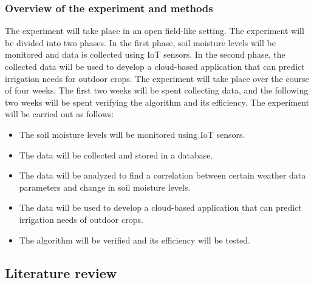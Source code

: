 \documentclass[11pt]{scrartcl} %
\begin{document}
\subsubsection{Overview of the experiment and methods}
The experiment will take place in an open field-like setting. The experiment will be divided into two phases. In the first phase, soil moisture levels will be monitored and data is collected using IoT sensors. In the second phase, the collected data will be used to develop a cloud-based application that can predict irrigation needs for outdoor crops. The experiment will take place over the course of four weeks. The first two weeks will be spent collecting data, and the following two weeks will be spent verifying the algorithm and its efficiency. The experiment will be carried out as follows:
\begin{itemize}
	\item The soil moisture levels will be monitored using IoT sensors.
	\item The data will be collected and stored in a database.
	\item The data will be analyzed to find a correlation between certain weather data parameters and change in soil moisture levels.
	\item The data will be used to develop a cloud-based application that can predict irrigation needs of outdoor crops.
	\item The algorithm will be verified and its efficiency will be tested.
\end{itemize}

\subsection{Literature review}
\end{document}
